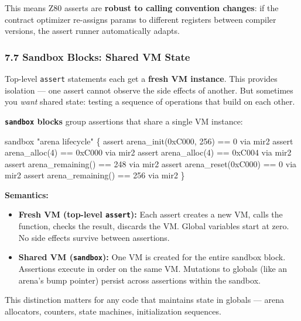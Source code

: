 \documentclass[
  11pt,
]{article}
\newenvironment{Shaded}{\begin{snugshade}}{\end{snugshade}}
\newcommand{\NormalTok}[1]{#1}
\begin{document}
This means Z80 asserts are \textbf{robust to calling convention
changes}: if the contract optimizer re-assigns params to different
registers between compiler versions, the assert runner automatically
adapts.

\hypertarget{sandbox-blocks-shared-vm-state}{%
\subsubsection{7.7 Sandbox Blocks: Shared VM
State}\label{sandbox-blocks-shared-vm-state}}

Top-level \texttt{assert} statements each get a \textbf{fresh VM
instance}. This provides isolation --- one assert cannot observe the
side effects of another. But sometimes you \emph{want} shared state:
testing a sequence of operations that build on each other.

\textbf{\texttt{sandbox} blocks} group assertions that share a single VM
instance:

\begin{Shaded}
\begin{Highlighting}[]
\NormalTok{sandbox "arena lifecycle" \{}
\NormalTok{    assert arena\_init(0xC000, 256) == 0 via mir2}
\NormalTok{    assert arena\_alloc(4) == 0xC000 via mir2}
\NormalTok{    assert arena\_alloc(4) == 0xC004 via mir2}
\NormalTok{    assert arena\_remaining() == 248 via mir2}
\NormalTok{    assert arena\_reset(0xC000) == 0 via mir2}
\NormalTok{    assert arena\_remaining() == 256 via mir2}
\NormalTok{\}}
\end{Highlighting}
\end{Shaded}

\textbf{Semantics:}

\begin{itemize}
\item
  \textbf{Fresh VM (top-level \texttt{assert}):} Each assert creates a
  new VM, calls the function, checks the result, discards the VM. Global
  variables start at zero. No side effects survive between assertions.
\item
  \textbf{Shared VM (\texttt{sandbox}):} One VM is created for the
  entire sandbox block. Assertions execute in order on the same VM.
  Mutations to globals (like an arena's bump pointer) persist across
  assertions within the sandbox.
\end{itemize}

This distinction matters for any code that maintains state in globals
--- arena allocators, counters, state machines, initialization
sequences.
\end{document}
